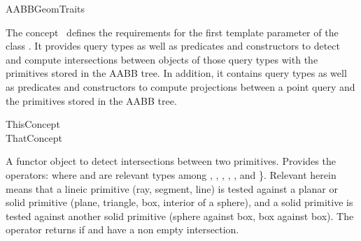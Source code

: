 \ccRefPageBegin


\begin{ccRefConcept}{AABBGeomTraits}


\ccDefinition
  
The concept \ccRefName\ defines the requirements for the first template parameter of the class . It provides query types as well as predicates and constructors to detect and compute intersections between objects of those query types with the primitives stored in the AABB tree. In addition, it contains query types as well as predicates and constructors to compute projections between a point query and the primitives stored in the AABB tree.

\ccGeneralizes

ThisConcept \\
ThatConcept

\ccTypes


\ccGlue
{}
\ccGlue
{}
\ccGlue
{}
\ccGlue
{}
\ccGlue
{}
\ccGlue
{}
\ccGlue
{}

{A functor object to detect intersections between two primitives.
Provides the operators:
where  and  are relevant types
among , , , , ,  and  \}. Relevant herein means that a lineic primitive (ray, segment, line) is tested against a planar or solid primitive (plane, triangle, box, interior of a sphere), and a solid primitive is tested against another solid primitive (sphere against box, box against box). The operator returns  if   and 
have a non empty intersection.}


\end{ccRefConcept}
